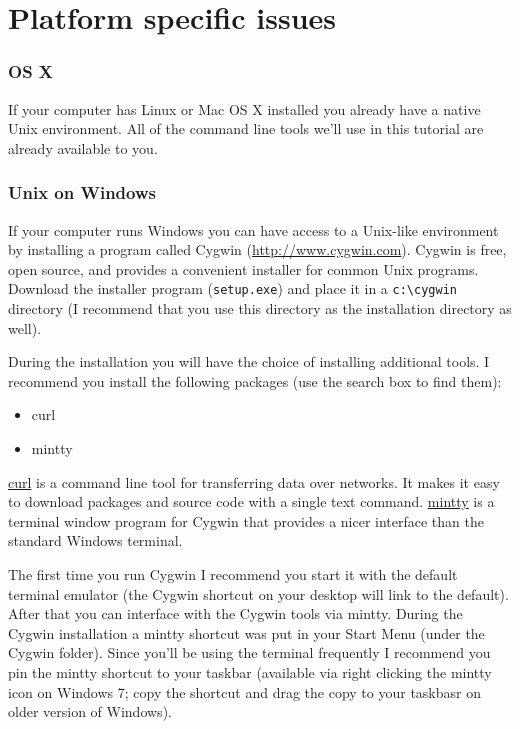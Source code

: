 
\section{Platform specific issues}

\subsubsection{OS X}
If your computer has Linux or Mac OS X installed you already have a native Unix environment.  All of the command line tools we'll use in this tutorial are already available to you.

\subsubsection{Unix on Windows}

If your computer runs Windows you can have access to a Unix-like environment by installing a program called Cygwin (\href{http://www.cygwin.com}{http://www.cygwin.com}).  Cygwin is free, open source, and provides a convenient installer for common Unix programs.  Download the installer program (\verb=setup.exe=) and place it in a \verb=c:\cygwin= directory (I recommend that you use this directory as the installation directory as well).  

During the installation you will have the choice of installing additional tools. I recommend you install the following packages (use the search box to find them):
\begin{itemize}
    \item curl
    \item mintty
\end{itemize}

\href{http://curl.haxx.se/}{curl} is a command line tool for transferring data over networks. It makes it easy to download packages and source code with a single text command. \href{http://code.google.com/p/mintty/}{mintty} is a terminal window program for Cygwin that provides a nicer interface than the standard Windows terminal. 

The first time you run Cygwin I recommend you start it with the default terminal emulator (the Cygwin shortcut on your desktop will link to the default). After that you can interface with the Cygwin tools via mintty. During the Cygwin installation a mintty shortcut was put in your Start Menu (under the Cygwin folder).  Since you'll be using the terminal frequently I recommend you pin the mintty shortcut to your taskbar (available via right clicking the mintty icon on Windows 7; copy the shortcut and drag the copy to your taskbasr on older version of Windows).

